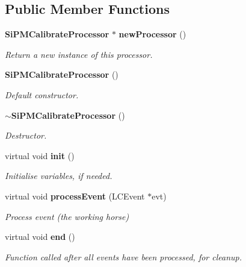 \subsection*{Public Member Functions}
\begin{DoxyCompactItemize}
\item 
{\bf Si\-P\-M\-Calibrate\-Processor} $\ast$ {\bf new\-Processor} ()\label{classCALICE_1_1SiPMCalibrateProcessor_afcf5d46a36704ca28d4b396e3c6c880c}

\begin{DoxyCompactList}\small\item\em Return a new instance of this processor. \end{DoxyCompactList}\item 
{\bf Si\-P\-M\-Calibrate\-Processor} ()\label{classCALICE_1_1SiPMCalibrateProcessor_a3bb0d0e2676910428b75c7b8b80ec87a}

\begin{DoxyCompactList}\small\item\em Default constructor. \end{DoxyCompactList}\item 
{\bf $\sim$\-Si\-P\-M\-Calibrate\-Processor} ()\label{classCALICE_1_1SiPMCalibrateProcessor_a428372dc991fcf2593166951c3f0365c}

\begin{DoxyCompactList}\small\item\em Destructor. \end{DoxyCompactList}\item 
virtual void {\bf init} ()\label{classCALICE_1_1SiPMCalibrateProcessor_aab2cba3af1a694e91a0574ffe20275c7}

\begin{DoxyCompactList}\small\item\em Initialise variables, if needed. \end{DoxyCompactList}\item 
virtual void {\bf process\-Event} (L\-C\-Event $\ast$evt)
\begin{DoxyCompactList}\small\item\em Process event (the working horse) \end{DoxyCompactList}\item 
virtual void {\bf end} ()\label{classCALICE_1_1SiPMCalibrateProcessor_a29f890dd2812216940bc4e4a1534da3d}

\begin{DoxyCompactList}\small\item\em Function called after all events have been processed, for cleanup. \end{DoxyCompactList}\end{DoxyCompactItemize}
